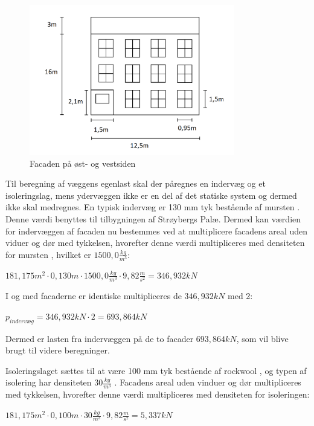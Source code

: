 \begin{figure}[htbp]
	\centering
	\includegraphics[width=0.8\textwidth]{billeder/facadenord.png}
	\caption{Facaden på øst- og vestsiden}
	\label{fig:facade}
\end{figure}

Til beregning af væggens egenlast skal der påregnes en indervæg og et isoleringslag, mens ydervæggen ikke er en del af det statiske system og dermed ikke skal medregnes.
\newline \indent{     }  En typisk indervæg er 130 mm tyk bestående af mursten \citep{indervaeg}. Denne værdi benyttes til tilbygningen af Strøybergs Palæ. Dermed kan værdien for indervæggen af facaden nu bestemmes ved at multiplicere facadens areal uden viduer og dør med tykkelsen, hvorefter denne værdi multipliceres med densiteten for mursten \citep{murstendensitet}, hvilket er $1500,\!0 \frac{kg}{m^3}$:
\begin{center}
	$181,\!175 m^2\cdot 0,\!130 m\cdot 1500,\!0 \frac{kg}{m^3}\cdot 9,\!82 \frac{m}{s^2}=346,\!932 kN$
\end{center}

I og med facaderne er identiske multipliceres de $346,\!932 kN$ med 2:
\begin{center}
	$p_{indervæg} = 346,\!932 kN\cdot 2 = 693,\!864 kN$
\end{center}

Dermed er lasten fra indervæggen på de to facader $693,\!864 kN$, som vil blive brugt til videre beregninger.

Isoleringslaget sættes til at være 100 mm tyk bestående af rockwool \citep{isolering}, og typen af isolering har densiteten $30 \frac{kg}{m^3}$ \citep{densitet}.
\newline \indent{     }  Facadens areal uden vinduer og dør multipliceres med tykkelsen, hvorefter denne værdi multipliceres med densiteten for isoleringen:
\begin{center}
	$181,\!175 m^2\cdot 0,\!100 m \cdot 30 \frac{kg}{m^3}\cdot 9,\!82 \frac{m}{s^2}=5,\!337 kN$
\end{center}

